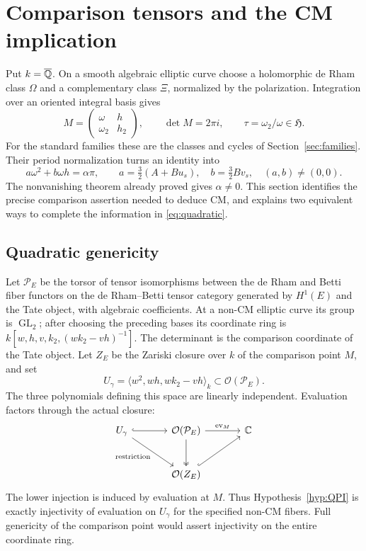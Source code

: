 \section{Comparison tensors and the CM implication}\label{sec:hinge}

Put $k=\overline{\mathbb Q}$.  On a smooth algebraic elliptic curve choose a
holomorphic de Rham class $\Omega$ and a complementary class $\Xi$,
normalized by the polarization.  Integration over an oriented integral
basis gives
\[
 M=\begin{pmatrix}\omega&h\\\omega_2&h_2\end{pmatrix},
 \qquad \det M=2\pi i,\qquad \tau=\omega_2/\omega\in\mathfrak H.
\]
For the standard families these are the classes and cycles of
Section~\ref{sec:families}.  Their period normalization turns an
identity into
\begin{equation}\label{eq:quadratic}
 a\omega^2+b\omega h=\alpha\pi,\qquad
 a=\tfrac32(A+Bu_s),\quad b=\tfrac32Bv_s,
 \quad(a,b)\ne(0,0).
\end{equation}
The nonvanishing theorem already proved gives $\alpha\ne0$.
This section identifies the precise comparison assertion needed to
deduce CM, and explains two equivalent ways to complete the information
in \eqref{eq:quadratic}.

\subsection{Quadratic genericity}
Let $\mathcal P_E$ be the torsor of tensor isomorphisms between the
de Rham and Betti fiber functors on the de Rham--Betti tensor category
generated by $H^1(E)$ and the Tate object, with algebraic coefficients.
At a non-CM elliptic curve its group is
$\operatorname{GL}_2$; after choosing the preceding bases its coordinate
ring is $k[w,h,v,k_2,(wk_2-vh)^{-1}]$.  The determinant is the comparison
coordinate of the Tate object.  Let $Z_E$ be the Zariski closure over
$k$ of the comparison point $M$, and set
\[
 U_\gamma=\langle w^2,wh,wk_2-vh\rangle_k\subset\mathcal O(\mathcal P_E).
\]
The three polynomials defining this space are linearly independent.
Evaluation factors through the actual closure:
\[
\begin{tikzcd}[column sep=large,row sep=large]
 U_\gamma\arrow[r,hook]\arrow[dr,"\mathrm{restriction}"']
 &\mathcal O(\mathcal P_E)\arrow[d,two heads]\arrow[r,"\operatorname{ev}_M"]
 &\mathbb C\\
 &\mathcal O(Z_E)\arrow[ur,hook]&
\end{tikzcd}
\]
The lower injection is induced by evaluation at $M$.  Thus
Hypothesis~\ref{hyp:QPI} is exactly injectivity of evaluation on
$U_\gamma$ for the specified non-CM fibers.  Full genericity of the
comparison point would assert injectivity on the entire coordinate ring.

